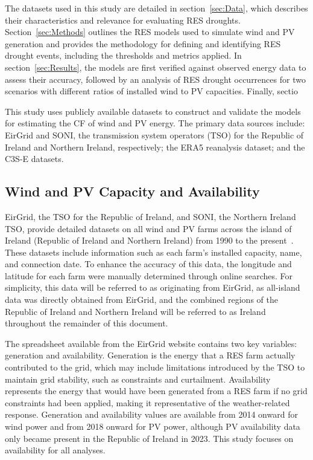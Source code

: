\documentclass[preprint, 12pt]{elsarticle}
\begin{document}
The datasets used in this study are detailed in section~\ref{sec:Data}, which describes their characteristics and relevance for evaluating RES droughts. Section~\ref{sec:Methods} outlines the RES models used to simulate wind and PV generation and provides the methodology for defining and identifying RES drought events, including the thresholds and metrics applied. In section~\ref{sec:Results}, the models are first verified against observed energy data to assess their accuracy, followed by an analysis of RES drought occurrences for two scenarios with different ratios of installed wind to PV capacities. Finally, sectio

This study uses publicly available datasets to construct and validate the models for estimating the CF of wind and PV energy. The primary data sources include: EirGrid and SONI, the transmission system operators (TSO) for the Republic of Ireland and Northern Ireland, respectively; the ERA5 reanalysis dataset; and the C3S-E datasets.

\subsection{Wind and PV Capacity and Availability}
\label{sec:eirgrid}

EirGrid, the TSO for the Republic of Ireland, and SONI, the Northern Ireland TSO, provide detailed datasets on all wind and PV farms across the island of Ireland (Republic of Ireland and Northern Ireland) from 1990 to the present~\citep{eirgrid2023spreadsheet}. These datasets include information such as each farm’s installed capacity, name, and connection date. To enhance the accuracy of this data, the longitude and latitude for each farm were manually determined through online searches. For simplicity, this data will be referred to as originating from EirGrid, as all-island data was directly obtained from EirGrid, and the combined regions of the Republic of Ireland and Northern Ireland will be referred to as Ireland throughout the remainder of this document.

The spreadsheet available from the EirGrid website contains two key variables: generation and availability. Generation is the energy that a RES farm actually contributed to the grid, which may include limitations introduced by the TSO to maintain grid stability, such as constraints and curtailment. Availability represents the energy that would have been generated from a RES farm if no grid constraints had been applied, making it representative of the weather-related response. Generation and availability values are available from 2014 onward for wind power and from 2018 onward for PV power, although PV availability data only became present in the Republic of Ireland in 2023. This study focuses on availability for all analyses.
\end{document}

